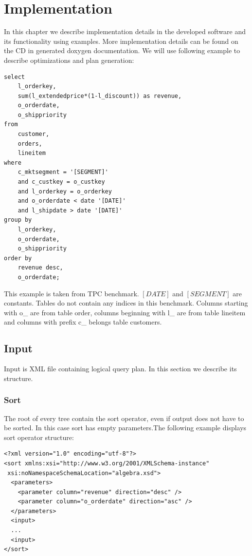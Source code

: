 \chapter{Implementation}
\label{implementation}
In this chapter we describe implementation details in the developed software and its functionality using examples. More implementation details can be found on the CD in generated doxygen\cite{doxygen} documentation. We will use following example to describe optimizations and plan generation:


\begin{verbatim}
select
    l_orderkey,
    sum(l_extendedprice*(1-l_discount)) as revenue,
    o_orderdate,
    o_shippriority
from
    customer,
    orders,
    lineitem
where
    c_mktsegment = '[SEGMENT]'
    and c_custkey = o_custkey
    and l_orderkey = o_orderkey
    and o_orderdate < date '[DATE]'
    and l_shipdate > date '[DATE]'
group by
    l_orderkey,
    o_orderdate,
    o_shippriority
order by
    revenue desc,
    o_orderdate;
\end{verbatim}

This example is taken from TPC benchmark\cite{benchmark}. $[DATE]$ and $[SEGMENT]$ are constants. Tables do not contain any indices in this benchmark. Columns starting with o\_ are from table order, columns beginning with l\_ are from table lineitem and columns with prefix c\_ belongs table customers.



\section{Input}

Input is XML file containing logical query plan. In this section we describe its structure. 

\subsection{Sort}

The root of every tree contain the sort operator, even if output does not have to be sorted. In this case sort has empty parameters.The following example displays sort operator structure:


\begin{lstlisting}
<?xml version="1.0" encoding="utf-8"?>
<sort xmlns:xsi="http://www.w3.org/2001/XMLSchema-instance"
 xsi:noNamespaceSchemaLocation="algebra.xsd">
  <parameters>
    <parameter column="revenue" direction="desc" />
    <parameter column="o_orderdate" direction="asc" />
  </parameters>
  <input>
  ...
  <input>
</sort>
\end{lstlisting}

